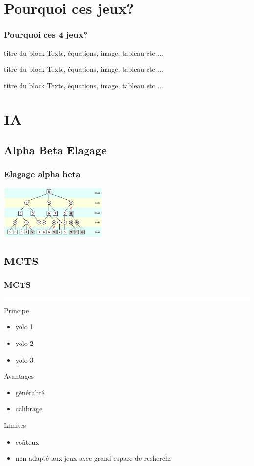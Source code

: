 \documentclass[11pt]{beamer}
\begin{document}
\section{Pourquoi ces jeux?}  
  \begin{frame}
  \frametitle{Pourquoi ces 4 jeux?}

\begin{block}{ titre du block }
      Texte, équations, image, tableau etc ...
\end{block}

\begin{block}{ titre du block }
      Texte, équations, image, tableau etc ...
\end{block}

\begin{block}{ titre du block }
      Texte, équations, image, tableau etc ...
\end{block}
			
  \end{frame}
    
\section{IA}
\subsection{Alpha Beta Elagage} 
  \begin{frame}
  \frametitle{Elagage alpha beta}

\includegraphics[width=150pt]{images/alphabeta.png}
  \end{frame}
 \subsection{MCTS}  
\begin{frame}
\frametitle{MCTS}
\color{blue}\rule{\linewidth}{4pt}
Principe
\begin{itemize}
	\item yolo 1
	\item yolo 2
	\item yolo 3
\end{itemize}
Avantages
\begin{itemize}
	\item généralité
	\item calibrage
\end{itemize}
Limites
\begin{itemize}
	\item      coûteux
	\item non adapté aux jeux avec grand espace de recherche
\end{itemize}
  \end{frame}
\end{document}

